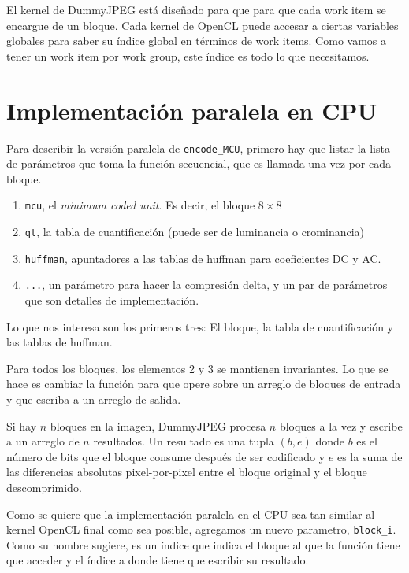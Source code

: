 El kernel de DummyJPEG está diseñado para que para que cada work item se encargue de
un bloque.  Cada kernel de OpenCL puede accesar a ciertas variables globales
para saber su índice global en términos de work items. Como vamos a tener un
work item por work group, este índice es todo lo que necesitamos.

\section{Implementación paralela en CPU}

Para describir la versión paralela de \verb+encode_MCU+, primero hay que listar
la lista de parámetros que toma la función secuencial, que es llamada una vez
por cada bloque.

\begin{enumerate}
    \item \verb+mcu+, el \emph{minimum coded unit}. Es decir, el bloque
        $8\times8$
    \item \verb+qt+, la tabla de cuantificación (puede ser de luminancia o
        crominancia)
    \item \verb+huffman+, apuntadores a las tablas de huffman para coeficientes
        DC y AC.
    \item \verb+...+, un parámetro para hacer la compresión delta, y un par de
        parámetros que son detalles de implementación.
\end{enumerate}

Lo que nos interesa son los primeros tres: El bloque, la tabla de
cuantificación y las tablas de huffman.

Para todos los bloques, los elementos 2 y 3 se mantienen invariantes. Lo que se
hace es cambiar la función para que opere sobre un arreglo de bloques de
entrada y que escriba a un arreglo de salida.

Si hay $n$ bloques en la imagen, DummyJPEG procesa $n$ bloques a la vez y
escribe a un arreglo de $n$ resultados. Un resultado es una tupla $(b, e)$
donde $b$ es el número de bits que el bloque consume después de ser codificado
y $e$ es la suma de las diferencias absolutas pixel-por-pixel entre el bloque
original y el bloque descomprimido.

Como se quiere que la implementación paralela en el CPU sea tan similar al
kernel OpenCL final como sea posible, agregamos un nuevo parametro,
\verb+block_i+. Como su nombre sugiere, es un índice que indica el bloque al
que la función tiene que acceder y el índice a donde tiene que escribir su
resultado.

